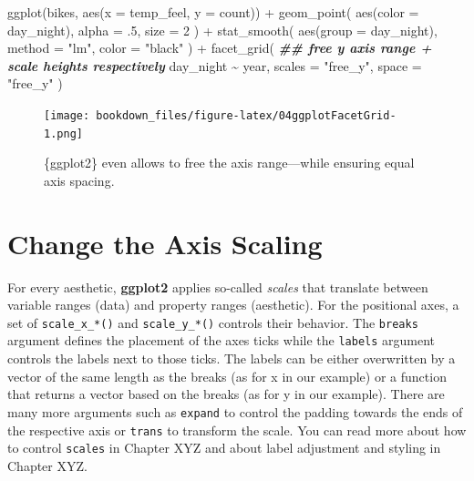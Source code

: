 \documentclass[
]{krantz}
\makeatletter
\newenvironment{Shaded}{\begin{snugshade}}{\end{snugshade}}
\newcommand{\AttributeTok}[1]{\textcolor[rgb]{0.61,0.61,0.61}{#1}}
\newcommand{\DecValTok}[1]{\textcolor[rgb]{0.06,0.06,0.06}{#1}}
\newcommand{\DocumentationTok}[1]{\textcolor[rgb]{0.37,0.37,0.37}{\textbf{\textit{#1}}}}
\newcommand{\FunctionTok}[1]{\textcolor[rgb]{0,0,0}{#1}}
\newcommand{\NormalTok}[1]{#1}
\newcommand{\SpecialCharTok}[1]{\textcolor[rgb]{0,0,0}{#1}}
\newcommand{\StringTok}[1]{\textcolor[rgb]{0.5,0.5,0.5}{#1}}
\newenvironment{kframe}{%
\medskip{}
\setlength{\fboxsep}{.8em}
 \def\at@end@of@kframe{}%
 \ifinner\ifhmode%
  \def\at@end@of@kframe{\end{minipage}}%
  \begin{minipage}{\columnwidth}%
 \fi\fi%
 \def\FrameCommand##1{\hskip\@totalleftmargin \hskip-\fboxsep
 \colorbox{shadecolor}{##1}\hskip-\fboxsep
     \hskip-\linewidth \hskip-\@totalleftmargin \hskip\columnwidth}%
 \MakeFramed {\advance\hsize-\width
   \@totalleftmargin\z@ \linewidth\hsize
   \@setminipage}}%
 {\par\unskip\endMakeFramed%
 \at@end@of@kframe}
\renewenvironment{Shaded}{\begin{kframe}}{\end{kframe}}
\makeatother
\begin{document}
\begin{Shaded}
\begin{Highlighting}[]
\FunctionTok{ggplot}\NormalTok{(bikes, }\FunctionTok{aes}\NormalTok{(}\AttributeTok{x =}\NormalTok{ temp\_feel, }\AttributeTok{y =}\NormalTok{ count)) }\SpecialCharTok{+} 
  \FunctionTok{geom\_point}\NormalTok{(}
    \FunctionTok{aes}\NormalTok{(}\AttributeTok{color =}\NormalTok{ day\_night), }\AttributeTok{alpha =}\NormalTok{ .}\DecValTok{5}\NormalTok{, }\AttributeTok{size =} \DecValTok{2}
\NormalTok{  ) }\SpecialCharTok{+} 
  \FunctionTok{stat\_smooth}\NormalTok{(}
    \FunctionTok{aes}\NormalTok{(}\AttributeTok{group =}\NormalTok{ day\_night), }\AttributeTok{method =} \StringTok{"lm"}\NormalTok{, }\AttributeTok{color =} \StringTok{"black"}
\NormalTok{  ) }\SpecialCharTok{+}
  \FunctionTok{facet\_grid}\NormalTok{(}
    \DocumentationTok{\#\# free y axis range + scale heights respectively}
\NormalTok{    day\_night }\SpecialCharTok{\textasciitilde{}}\NormalTok{ year, }\AttributeTok{scales =} \StringTok{"free\_y"}\NormalTok{, }\AttributeTok{space =} \StringTok{"free\_y"}
\NormalTok{  )}
\end{Highlighting}
\end{Shaded}

\begin{figure}
\centering
\texttt{[image: bookdown\_files/figure-latex/04ggplotFacetGrid-1.png]}
\caption{\label{fig:04ggplotFacetGrid}\{ggplot2\} even allows to free the axis range---while ensuring equal axis spacing.}
\end{figure}

\hypertarget{axis-scaling}{%
\section{Change the Axis Scaling}\label{axis-scaling}}

For every aesthetic, \textbf{ggplot2} applies so-called \emph{scales} that translate between variable ranges (data) and property ranges (aesthetic). For the positional axes, a set of \texttt{scale\_x\_*()} and \texttt{scale\_y\_*()} controls their behavior. The \texttt{breaks} argument defines the placement of the axes ticks while the \texttt{labels} argument controls the labels next to those ticks. The labels can be either overwritten by a vector of the same length as the breaks (as for x in our example) or a function that returns a vector based on the breaks (as for y in our example). There are many more arguments such as \texttt{expand} to control the padding towards the ends of the respective axis or \texttt{trans} to transform the scale. You can read more about how to control \texttt{scales} in Chapter XYZ and about label adjustment and styling in Chapter XYZ.
\end{document}
